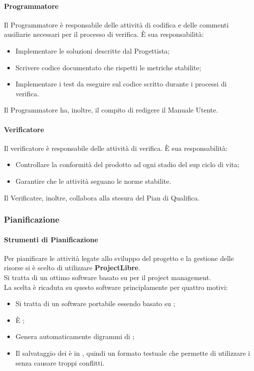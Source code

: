         \paragraph{Programmatore}
          Il Programmatore è responsabile delle attività di codifica e delle commenti ausiliarie necessari per il processo di verifica.
          È sua responsabilità:
          \begin{itemize}
            \item Implementare le soluzioni descritte dal Progettista;
            \item Scrivere codice documentato che rispetti le metriche stabilite;
            \item Implementare i test da eseguire sul codice scritto durante i processi di verifica.
          \end{itemize}
          Il Programmatore ha, inoltre, il compito di redigere il Manuale Utente.
        \paragraph{Verificatore}
          Il verificatore è responsabile delle attività di verifica.
          È sua responsabilità:
          \begin{itemize}
            \item Controllare la conformità del prodotto ad ogni stadio del sup ciclo di vita;
            \item Garantire  che le attività seguano le norme stabilite.
          \end{itemize}
          Il Verificatre, inoltre, collabora alla stesura del Pian di Qualifica.
    \subsubsection{Pianificazione}
      \paragraph{Strumenti di Pianificazione}
        Per pianificare le attività legate allo sviluppo del progetto e la gestione delle risorse si è scelto di utilizzare \textbf{ProjectLibre}.\\
        Si tratta di un ottimo software  basato su  per il project management.\\
        La scelta è ricaduta su questo software principlamente per quattro motivi:
        \begin{itemize}
          \item Si tratta di un software portabile essendo basato su ;
          \item È ;
          \item Genera automaticamente digrammi di ;
          \item Il salvataggio dei  è in , quindi un formato testuale che permette di utilizzare i  senza causare troppi conflitti.
        \end{itemize}
